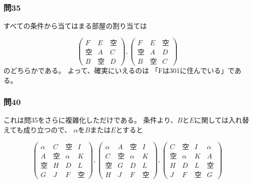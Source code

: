 \documentclass[12pt]{jarticle}
\begin{document}
\subsubsection{問35}
すべての条件から当てはまる部屋の割り当ては

\[
    \left(
    \begin{array}{ccc}
            F  & E  & 空 \\
            空 & A  & C  \\
            B  & 空 & D
        \end{array}
    \right),
    \left(
    \begin{array}{ccc}
            F  & E  & 空 \\
            空 & A  & D  \\
            B  & 空 & C
        \end{array}
    \right)
\]
のどちらかである。
よって、確実にいえるのは
「Fは301に住んでいる」である。

\clearpage

\subsubsection{問40}
これは問35をさらに複雑化しただけである。
条件より、$BとE$に関しては入れ替えても成り立つので、
$\alpha$を$B$または$E$とすると

\[
    \left(
    \begin{array}{cccc}
            \alpha & C  & 空     & I  \\
            A      & 空 & \alpha & K  \\
            空     & H  & D      & L  \\
            G      & J  & F      & 空
        \end{array}
    \right),
    \left(
    \begin{array}{cccc}
            \alpha & A  & 空     & I  \\
            C      & 空 & \alpha & K  \\
            空     & G  & D      & L  \\
            H      & J  & F      & 空
        \end{array}
    \right),
    \left(
    \begin{array}{cccc}
            C  & 空     & I  & \alpha \\
            空 & \alpha & K  & A      \\
            H  & D      & L  & 空     \\
            J  & F      & 空 & G
        \end{array}
    \right)
\]
\end{document}
